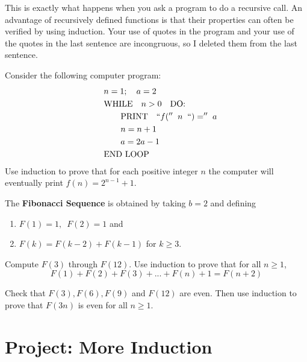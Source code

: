 This is exactly what happens when you ask a program to do a recursive call.  An advantage of recursively defined functions is that their properties can often be verified by using induction.   Your use of quotes in the program and your use of the quotes in the last sentence are incongruous, so I deleted them from the last sentence.
\begin{prb}
Consider the following computer program:
\begin{align}
                &\quad   n = 1;  \quad a = 2 \notag\\
                 & \quad \mbox{WHILE} \quad  n > 0 \quad  \mbox{DO:}\notag\\
                 & \quad \qquad   \mbox{PRINT} \quad ``f('' \; \; n  \; \;``) ='' \; a \notag\\
                 & \quad \qquad   n=n+1\notag\\
                 & \quad \qquad   a=2a-1\notag\\
                 & \quad \mbox{END LOOP} \notag
\end{align}
Use induction to prove that for each positive integer $n$ the computer will eventually print $f(n) = 2^{n-1} + 1$.
\end{prb}

\begin{prb}
The \textbf{Fibonacci Sequence} is obtained by taking $b=2$ and defining
\begin{enumerate}
\item $F(1) = 1, \enspace F(2) = 1$  and
\item $F(k) = F(k-2) + F(k-1)$  for $k \ge 3$.
\end{enumerate}
Compute $F(3)$ through $F(12)$. Use induction to prove that for all $n \ge 1$,
\[
F(1) + F(2) + F(3) + ... + F(n) + 1= F(n+2)
\]
\end{prb}

\begin{prb}
Check that $F(3), F(6), F(9)$ and $F(12)$ are even.  Then use induction to prove that  $F(3n)$  is even for all $n \ge 1$.
\end{prb}

\section{Project: More Induction}

